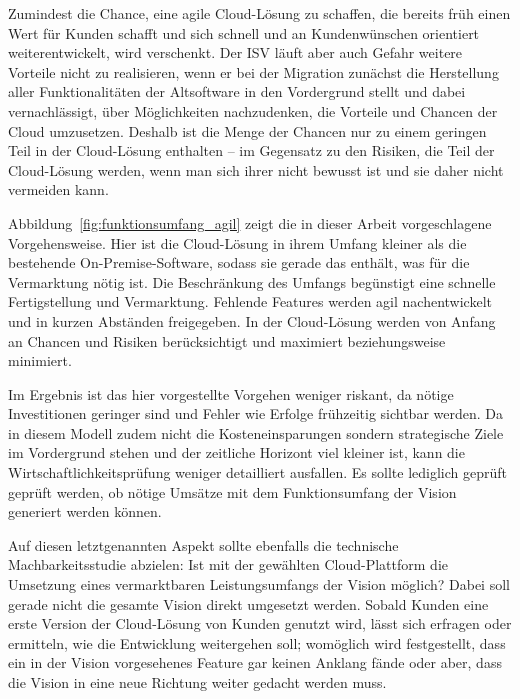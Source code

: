 Zumindest die Chance, eine agile Cloud-Lösung zu schaffen, die 
bereits früh einen Wert für Kunden schafft und sich schnell und an 
Kundenwünschen orientiert weiterentwickelt, wird verschenkt. Der ISV 
läuft aber auch Gefahr weitere Vorteile nicht zu realisieren, wenn er bei der 
Migration zunächst die Herstellung aller Funktionalitäten der Altsoftware in 
den Vordergrund stellt und dabei vernachlässigt, über Möglichkeiten 
nachzudenken, die Vorteile und Chancen der Cloud umzusetzen. Deshalb ist die 
Menge der Chancen nur zu einem geringen Teil in der Cloud-Lösung enthalten -- 
im Gegensatz zu den Risiken, die Teil der Cloud-Lösung werden, wenn man sich 
ihrer nicht bewusst ist und sie daher nicht vermeiden kann.


Abbildung~\ref{fig:funktionsumfang_agil} zeigt die in dieser Arbeit 
vorgeschlagene Vorgehensweise. Hier ist die Cloud-Lösung in ihrem Umfang kleiner 
als die bestehende On-Premise-Software, sodass sie gerade das 
enthält, was für die Vermarktung nötig ist. Die Beschränkung des Umfangs 
begünstigt eine schnelle Fertigstellung und Vermarktung. Fehlende Features 
werden agil nachentwickelt und in kurzen Abständen freigegeben. In der 
Cloud-Lösung werden von Anfang an Chancen und Risiken berücksichtigt und 
maximiert beziehungsweise minimiert. 

Im Ergebnis ist das hier vorgestellte Vorgehen weniger riskant, da nötige 
Investitionen geringer sind und Fehler wie Erfolge frühzeitig sichtbar werden. 
Da in diesem Modell zudem nicht die Kosteneinsparungen sondern strategische 
Ziele im Vordergrund stehen und der zeitliche Horizont viel kleiner ist, kann 
die Wirtschaftlichkeitsprüfung weniger detailliert ausfallen. Es sollte 
lediglich geprüft geprüft werden, ob nötige Umsätze mit dem Funktionsumfang der 
Vision generiert werden können. 

Auf diesen letztgenannten Aspekt sollte ebenfalls die technische 
Machbarkeitsstudie abzielen: Ist mit der gewählten Cloud-Plattform die 
Umsetzung eines vermarktbaren Leistungsumfangs der Vision möglich? Dabei soll 
gerade nicht die gesamte Vision direkt umgesetzt werden. Sobald Kunden eine 
erste Version der Cloud-Lösung von Kunden genutzt wird, lässt sich erfragen 
oder ermitteln, wie die Entwicklung weitergehen soll; womöglich wird 
festgestellt, dass ein in der Vision vorgesehenes Feature gar keinen Anklang 
fände oder aber, dass die Vision in eine neue Richtung weiter gedacht werden 
muss.


